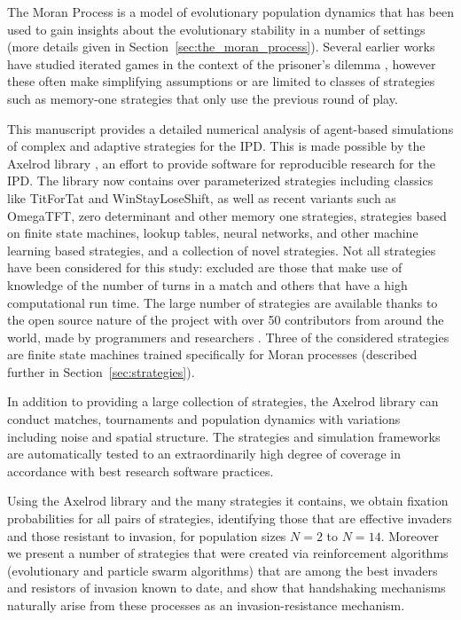 \documentclass{article}
\begin{document}
The Moran Process \cite{Moran1957} is a model of
evolutionary population dynamics that has been used to gain insights about the
evolutionary stability in a number of settings (more details given in
Section~\ref{sec:the_moran_process}).
Several earlier
works have studied iterated games in the context of the prisoner's dilemma
\cite{Nowak, stewart2013extortion}, however these often make simplifying assumptions
or are limited to classes of strategies
such as memory-one strategies that only use the previous round of play.

This manuscript provides a detailed numerical analysis of agent-based simulations
of \textbf{}complex and adaptive strategies for the
IPD\@. This is made possible by the Axelrod library \cite{axelrodproject}, an
effort to provide software for reproducible research for the IPD\@. The library
now contains over parameterized
strategies including classics like TitForTat and WinStayLoseShift, as well as
recent variants such as OmegaTFT, zero determinant and other memory one
strategies, strategies based on finite state machines, lookup tables, neural
networks, and other machine learning based strategies, and a collection of novel
strategies. Not all strategies have been considered for this study: excluded
are those that make use of knowledge of the number of turns in a match
and others that have a high
computational run time. The large number of strategies are available thanks to
the open source nature of the project with over 50 contributors from around the
world, made by programmers and researchers \cite{Knight2016}. Three of the considered
strategies are finite state machines trained specifically for Moran processes
(described further in Section~\ref{sec:strategies}).

In addition to providing a large collection of strategies, the Axelrod library
can conduct matches, tournaments and population
dynamics with variations including noise and spatial structure.
The strategies and simulation frameworks are
automatically tested to an extraordinarily high degree of coverage in accordance
with best research software practices.

Using the Axelrod library and the many strategies it contains, we obtain
fixation probabilities for all pairs of strategies, identifying
those that are effective invaders and those resistant to invasion, for
population sizes $N=2$ to $N=14$. Moreover we present a number of strategies
that were created via reinforcement algorithms (evolutionary and particle
swarm algorithms) that are among the best invaders and resistors of invasion
known to date, and show that handshaking mechanisms naturally arise from these
processes as an invasion-resistance mechanism.
\end{document}
